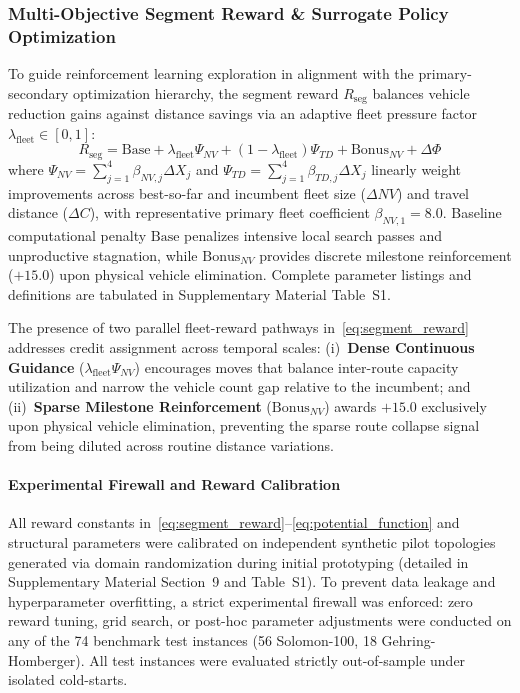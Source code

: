\documentclass{ieeeaccess}
\begin{document}
\subsubsection{Multi-Objective Segment Reward \& Surrogate Policy Optimization}
To guide reinforcement learning exploration in alignment with the primary-secondary optimization hierarchy, the segment reward $R_{\text{seg}}$ balances vehicle reduction gains against distance savings via an adaptive fleet pressure factor $\lambda_{\text{fleet}} \in [0, 1]$:
\begin{equation}
  R_{\text{seg}} = \text{Base} + \lambda_{\text{fleet}} \Psi_{NV} + (1 - \lambda_{\text{fleet}}) \Psi_{TD} + \text{Bonus}_{NV} + \Delta \Phi
  \label{eq:segment_reward}
\end{equation}
where $\Psi_{NV} = \sum_{j=1}^4 \beta_{NV, j} \Delta X_j$ and $\Psi_{TD} = \sum_{j=1}^4 \beta_{TD, j} \Delta X_j$ linearly weight improvements across best-so-far and incumbent fleet size ($\Delta NV$) and travel distance ($\Delta C$), with representative primary fleet coefficient $\beta_{NV, 1} = 8.0$. Baseline computational penalty $\text{Base}$ penalizes intensive local search passes and unproductive stagnation, while $\text{Bonus}_{NV}$ provides discrete milestone reinforcement ($+15.0$) upon physical vehicle elimination. Complete parameter listings and definitions are tabulated in Supplementary Material Table~S1.

The presence of two parallel fleet-reward pathways in~\eqref{eq:segment_reward} addresses credit assignment across temporal scales: (i)~\textbf{Dense Continuous Guidance} ($\lambda_{\text{fleet}} \Psi_{NV}$) encourages moves that balance inter-route capacity utilization and narrow the vehicle count gap relative to the incumbent; and (ii)~\textbf{Sparse Milestone Reinforcement} ($\text{Bonus}_{NV}$) awards $+15.0$ exclusively upon physical vehicle elimination, preventing the sparse route collapse signal from being diluted across routine distance variations.

\paragraph{Experimental Firewall and Reward Calibration}
All reward constants in~\eqref{eq:segment_reward}--\eqref{eq:potential_function} and structural parameters were calibrated on independent synthetic pilot topologies generated via domain randomization during initial prototyping (detailed in Supplementary Material Section~9 and Table~S1). To prevent data leakage and hyperparameter overfitting, a strict experimental firewall was enforced: zero reward tuning, grid search, or post-hoc parameter adjustments were conducted on any of the 74 benchmark test instances (56 Solomon-100, 18 Gehring-Homberger). All test instances were evaluated strictly out-of-sample under isolated cold-starts.
\end{document}
